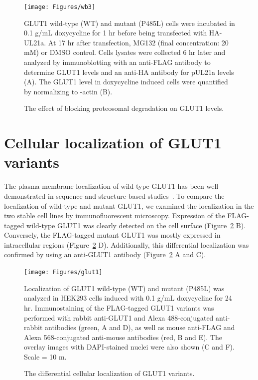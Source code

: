 \begin{figure}[h]
\centering
\texttt{[image: Figures/wb3]}
\caption{The effect of blocking proteosomal degradation on GLUT1 levels.}
\vspace*{-3mm}
\small \justify
GLUT1 wild-type (WT) and mutant (P485L) cells were incubated in 0.1 \textmu g/mL doxycycline for 1 hr before being transfected with HA-UL21a. At 17 hr after transfection, MG132 (final concentration: 20 mM) or DMSO control. Cells lysates were collected 6 hr later and analyzed by immunoblotting with an anti-FLAG antibody to determine GLUT1 levels and an anti-HA antibody for pUL21a levels (A). The GLUT1 level in doxycycline induced cells were quantified by normalizing to \textbeta -actin (B).
\label{fig:wb3}
\end{figure}
\section{Cellular localization of GLUT1 variants}
The plasma membrane localization of wild-type GLUT1 has been well demonstrated in sequence and structure-based studies~\cite{Mueckler.2,Hresko,Hruz}.
To compare the localization of wild-type and mutant GLUT1, we examined the localization in the two stable cell lines by immunofluorescent microscopy. Expression of the FLAG-tagged wild-type GLUT1 was clearly detected on the cell surface (Figure~\ref{fig:glut1} B). Conversely, the FLAG-tagged mutant GLUT1 was mostly expressed in intracellular regions (Figure~\ref{fig:glut1} D). Additionally, this differential localization was confirmed by using an anti-GLUT1 antibody (Figure~\ref{fig:glut1} A and C).

\begin{figure}[h]
\centering
\texttt{[image: Figures/glut1]}
\caption{The differential cellular localization of GLUT1 variants.}
\vspace*{-3mm}
\small \justify
Localization of GLUT1 wild-type (WT) and mutant (P485L) was analyzed in HEK293 cells induced with 0.1 \textmu g/mL doxycycline for 24 hr. Immunostaining of the FLAG-tagged GLUT1 variants was performed with rabbit anti-GLUT1 and Alexa 488-conjugated anti-rabbit antibodies (green, A and D), as well as mouse anti-FLAG and Alexa 568-conjugated anti-mouse antibodies (red, B and E). The overlay images with DAPI-stained nuclei were also shown (C and F). Scale = 10 \textmu m.
\label{fig:glut1}
\end{figure}
